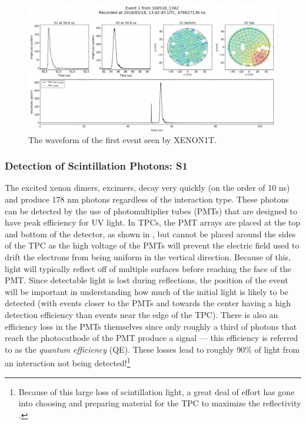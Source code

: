  \begin{figure}[t]
	\centering
	\includegraphics[width=0.99\textwidth]{tpc_waveform}
	\caption{The waveform of the first event seen by XENON1T.}
	\label{fig:tpc_waveform}
\end{figure}


\subsubsection{Detection of Scintillation Photons: S1}

The excited xenon dimers, excimers, decay very quickly (on the order of 10 ns) and produce 178 nm photons regardless of the interaction type.  These photons can be detected by the use of photomultiplier tubes (PMTs) that are designed to have peak efficiency for UV light.  In TPCs, the PMT arrays are placed at the top and bottom of the detector, as shown in , but cannot be placed around the sides of the TPC as the high voltage of the PMTs will prevent the electric field used to drift the electrons from being uniform in the vertical direction.  Because of this, light will typically reflect off of multiple surfaces before reaching the face of the PMT.  Since detectable light is lost during reflections, the position of the event will be important in understanding how much of the initial light is likely to be detected (with events closer to the PMTs and towards the center having a high detection efficiency than events near the edge of the TPC).  There is also an efficiency loss in the PMTs themselves since only roughly a third of photons that reach the photocathode of the PMT produce a signal --- this efficiency is referred to as the \textit{quantum efficiency} (QE).  These losses lead to roughly 90\% of light from an interaction not being detected!\footnote{Because of this large loss of scintillation light, a great deal of effort has gone into choosing and preparing material for the TPC to maximize the reflectivity \cite{silva2009reflectance, haefner2017reflectance, neves2017measurement}.}  

